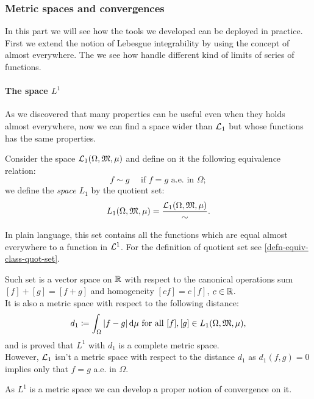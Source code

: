 \subsubsection{Metric spaces and convergences}

In this part we will see how the tools we developed can be deployed in practice. First we extend the notion of Lebesgue integrability by using the concept of almost everywhere. The we see how handle different kind of limits of series of functions.

\paragraph{The space $L^1$} As we discovered that many properties can be useful even when they holds almost everywhere, now we can find a space wider than $\mathcal L_1$ but whose functions has the same properties.

\begin{defn}\label{L1-space}
	Consider the space $\mathcal L_1(\Omega, \mathfrak M, \mu)$ and define on it the following equivalence relation: 
	$$
		f \sim g 
		\quad \text{ if }  
		f = g 
		\text{ a.e. in }\Omega
	;
	$$
	we define the \emph{space $L_1$} by the quotient set:
	$$L_1(\Omega, \mathfrak M, \mu)=\frac{\mathcal L_1(\Omega, \mathfrak M, \mu)}{\sim}.$$
\end{defn}

In plain language, this set contains all the functions which are equal almost everywhere to a function in $\mathcal L^1$.
For the definition of quotient set see \vref{defn-equiv-class-quot-set}.

Such set is a vector space on $\mathbb R$ with respect to the canonical operations sum $[f]+[g]=[f+g]$ and homogeneity $[c f] = c[f]$, $c \in \mathbb R$.\\
It is also a metric space with respect to the following distance:
$$
	d_1 
	\coloneqq \int_\Omega |f-g| \, \mathrm d \mu
	\text{ for all } [f],[g]
	\in L_1(\Omega, \mathfrak M, \mu)
,
$$
and is proved that $L^1$ with $d_1$ is a complete metric space.\\
However, $\mathcal L_1$ isn't a metric space with respect to the distance $d_1$ as $d_1(f,g) = 0$ implies only that $f=g$ a.e. in $\Omega$.

As $L^1$ is a metric space we can develop a proper notion of convergence on it.

